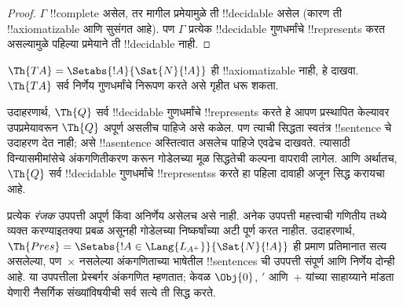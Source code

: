 \documentclass[../../../include/open-logic-section]{subfiles}
\begin{document}
\begin{proof}
$\Gamma$ !!{complete} असेल, तर मागील प्रमेयामुळे ती
!!{decidable} असेल (कारण ती !!{axiomatizable} आणि सुसंगत आहे).
पण $\Gamma$ प्रत्येक !!{decidable} गुणधर्मांचे !!{represents}
करत असल्यामुळे पहिल्या प्रमेयाने ती !!{decidable} नाही.
\end{proof}

\begin{prob}
$\Th{TA} = \Setabs{!A}{\Sat{N}{!A}}$ ही !!{axiomatizable}
नाही, हे दाखवा. $\Th{TA}$ सर्व निर्णेय गुणधर्मांचे निरूपण करते
असे गृहीत धरू शकता.
\end{prob}

उदाहरणार्थ, $\Th{Q}$ सर्व !!{decidable} गुणधर्मांचे !!{represents}
करते हे आपण प्रस्थापित केल्यावर उपप्रमेयावरून $\Th{Q}$ अपूर्ण
असलीच पाहिजे असे कळेल. पण त्याची सिद्धता स्वतंत्र !!{sentence}
चे उदाहरण देत नाही; असे !!a{sentence} अस्तित्वात असलेच पाहिजे
एवढेच दाखवते. त्यासाठी विन्यासमीमांसेचे अंकगणितीकरण करून
गोडेलच्या मूळ सिद्धतेची कल्पना वापरावी लागेल. आणि अर्थातच,
$\Th{Q}$ सर्व !!{decidable} गुणधर्मांचे !!{represents}s करते हा
पहिला दावाही अजून सिद्ध करायचा आहे.

प्रत्येक \emph{रंजक} उपपत्ती अपूर्ण किंवा अनिर्णेय असेलच असे
नाही. अनेक उपपत्ती महत्त्वाची गणितीय तथ्ये व्यक्त करण्याइतक्या
प्रबळ असूनही गोडेलच्या निष्कर्षांच्या अटी पूर्ण करत नाहीत.
उदाहरणार्थ, $\Th{Pres} = \Setabs{!A \in \Lang{L_{A^+}}}{\Sat{N}{!A}}$
ही प्रमाण प्रतिमानात सत्य असलेल्या, पण~$\times$ नसलेल्या
अंकगणिताच्या भाषेतील !!{sentence}s ची उपपत्ती संपूर्ण आणि
निर्णेय दोन्ही आहे. या उपपत्तीला प्रेस्बर्गर अंकगणित म्हणतात;
केवळ $\Obj{0}$, $\prime$ आणि~$+$ यांच्या साहाय्याने मांडता
येणारी नैसर्गिक संख्यांविषयीची सर्व सत्ये ती सिद्ध करते.
\end{document}
